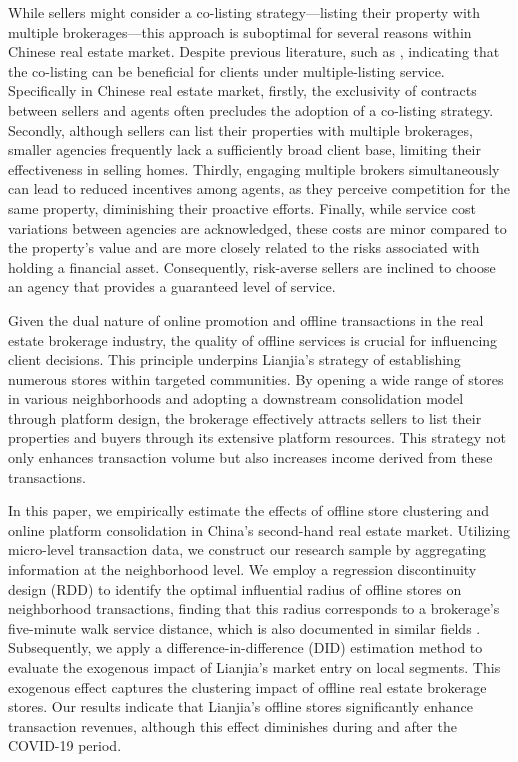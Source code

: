 \documentclass[11pt]{article}
\begin{document}
While sellers might consider a co-listing strategy—listing their property with multiple brokerages—this approach is suboptimal for several reasons within Chinese real estate market. Despite previous literature, such as \citep{RePEc:kap:jrefec:v:67:y:2023:i:3:d:10.1007_s11146-021-09858-w}, indicating that the co-listing can be beneficial for clients under multiple-listing service. Specifically in Chinese real estate market, firstly, the exclusivity of contracts between sellers and agents often precludes the adoption of a co-listing strategy. Secondly, although sellers can list their properties with multiple brokerages, smaller agencies frequently lack a sufficiently broad client base, limiting their effectiveness in selling homes. Thirdly, engaging multiple brokers simultaneously can lead to reduced incentives among agents, as they perceive competition for the same property, diminishing their proactive efforts. Finally, while service cost variations between agencies are acknowledged, these costs are minor compared to the property's value and are more closely related to the risks associated with holding a financial asset. Consequently, risk-averse sellers are inclined to choose an agency that provides a guaranteed level of service. 

Given the dual nature of online promotion and offline transactions in the real estate brokerage industry, the quality of offline services is crucial for influencing client decisions. This principle underpins Lianjia's strategy of establishing numerous stores within targeted communities. By opening a wide range of stores in various neighborhoods and adopting a downstream consolidation model through platform design, the brokerage effectively attracts sellers to list their properties and buyers through its extensive platform resources. This strategy not only enhances transaction volume but also increases income derived from these transactions.

In this paper, we empirically estimate the effects of offline store clustering and online platform consolidation in China's second-hand real estate market. Utilizing micro-level transaction data, we construct our research sample by aggregating information at the neighborhood level. We employ a regression discontinuity design (RDD) to identify the optimal influential radius of offline stores on neighborhood transactions, finding that this radius corresponds to a brokerage's five-minute walk service distance, which is also documented in similar fields \citep{AZMI2012406}. Subsequently, we apply a difference-in-difference (DID) estimation method to evaluate the exogenous impact of Lianjia's market entry on local segments. This exogenous effect captures the clustering impact of offline real estate brokerage stores. Our results indicate that Lianjia's offline stores significantly enhance transaction revenues, although this effect diminishes during and after the COVID-19 period.
\end{document}
